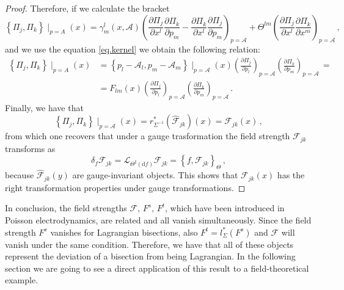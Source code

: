 \documentclass[12pt,a4paper]{article}
\numberwithin{equation}{section}
\theoremstyle{definition}
\newcommand{\dd}{\mathrm{d}}
\begin{document}
{\begin{proof}
Therefore, if we calculate the bracket
\begin{equation}
\left\lbrace \Pi_j, \Pi_k \right\rbrace \mid_{p=A}(x) = \gamma^{l}_{m}(x,\mathcal{A}) \left( \frac{\partial \Pi_j}{\partial x^l} \frac{\partial \Pi_k}{\partial p_m} - \frac{\partial \Pi_k}{\partial x^l}\frac{\partial \Pi_j}{\partial p_m} \right)_{p=\mathcal{A}} + \Theta^{lm}\left( \frac{\partial \Pi_j}{\partial x^l}\frac{\partial \Pi_k}{\partial x^m} \right)_{p=\mathcal{A}}\,,
\end{equation}
and we use the equation \eqref{eq.kernel} we obtain the following relation:
\begin{equation}
\begin{split}
\left\lbrace \Pi_j, \Pi_k \right\rbrace \mid_{p=A}(x) &= \left\lbrace p_l - \mathcal{A}_l, p_m-\mathcal{A}_m \right\rbrace\mid_{p=\mathcal{A}} (x)\left( \frac{\partial \Pi_j}{\partial p_l}\right)_{p=\mathcal{A}} \left( \frac{\partial \Pi_k}{\partial p_m} \right)_{p=\mathcal{A}}\, = \\ &=F_{lm}(x)\left( \frac{\partial \Pi_j}{\partial p_l}\right)_{p=\mathcal{A}} \left( \frac{\partial \Pi_k}{\partial p_m} \right)_{p=\mathcal{A}}\,.
\end{split}
\end{equation}
Finally, we have that 
\begin{equation}
\left\lbrace \Pi_j, \Pi_k \right\rbrace \mid_{p=\mathcal{A}} (x)= r_{\Sigma^{-1}}^*(\widehat{\mathcal{F}}_{jk})(x) = \mathcal{F}_{jk} (x)\,,
\end{equation}
from which one recovers that under a gauge trasformation the field strength ${\mathcal{F}}_{jk}$ transforms as 
\begin{equation}
\delta_f {\mathcal{F}}_{jk} = \mathcal{L}_{{\Theta^{\sharp}(\dd f)}} {\mathcal{F}}_{jk} = \left\lbrace f, {\mathcal{F}}_{jk} \right\rbrace_{\Theta}\,,
\end{equation}
because $\widehat{\mathcal{F}}_{jk}(y)$ are gauge-invariant objects. This shows that $\mathcal{F}_{jk}(x)$ has the right transformation properties under gauge transformations.
\end{proof}

In conclusion, the field strengths $\mathcal{F},\, F^s,\,F^t$, which have been introduced in Poisson electrodynamics, are related and all vanish simultaneously. Since the field strength $F^s$ vanishes for Lagrangian bisections, also $F^t = l_{\Sigma}^*(F^s)$ and $\mathcal{F}$ will vanish under the same condition. Therefore, we have that all of these objects represent the deviation of a bisection from being Lagrangian. In the following section we are going to see a direct application of this result to a field-theoretical example.

}
\end{document}
